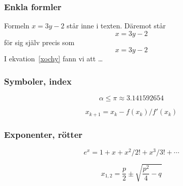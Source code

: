 \begin{frame}[fragile=singleslide]
\frametitle{Enkla formler}
\begin{mexempel}
Formeln $x=3y-2$ står 
inne i texten. Däremot
står
\begin{displaymath}
  x=3y-2
\end{displaymath}
för sig själv precis som
\begin{equation}
  x=3y-2
  \label{xochy}
\end{equation}
I ekvation~\ref{xochy} fann
vi att \ldots
\end{mexempel}
\end{frame} 

\begin{frame}[fragile=singleslide]
\frametitle{Symboler, index}
\begin{mexempel}
\begin{displaymath}
\alpha \leq \pi \approx 3.141592654
\end{displaymath}
\end{mexempel}

\vspace{1cm}

\begin{mexempel}
\begin{displaymath}
x_{k+1}=x_{k}-f(x_{k})/f'(x_{k})
\end{displaymath}
\end{mexempel}
\end{frame} 

\begin{frame}[fragile=singleslide]
\frametitle{Exponenter, rötter}
\begin{mexempel}
\begin{displaymath}
e^x = 1+x+x^2/2!+x^3/3!+\cdots
\end{displaymath}
\end{mexempel}

\vspace{1cm}

\begin{mexempel}
\begin{displaymath}
x_{1,2}=\frac{p}{2}\pm
\sqrt{\frac{p^2}{4}-q}
\end{displaymath}
\end{mexempel}

\end{frame} 



